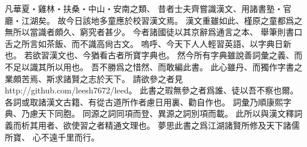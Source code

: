 凡華夏・雞林・扶桑・中山・安南之類、
昔者士夫齊嘗識漢文、用諸書塾・官廳・江湖矣。
故今日該地多童應於校習漢文焉。
漢文重雖如此、槿原之童都爲之無所以當識者頗久、窮究者甚少。
今者諸國徒以其京辭爲通言之本、
舉筆則書口舌之所言如茶飯、而不識高尙古文。
嗚呼、今天下人人輕習英語、以字典日新也。
若欲習漢文也、今猶看古者所寶字典也。
然今所有字典雖說善詞彙之義、而不足以識其所以用也。
吾不勝爲之惜然、而敢編此書。
此心雖丹、而獨作字書之業頗苦焉、斯求諸賢之志於天下。
請欲參之者見 http://github.com/leesh7672/leed。
此書之瑕無參之者爲誰、徒以吾不察也爾。
各詞或取諸漢文古籍、有從古道所作者慮日用裏、勸自作也。
詞彙乃順康熙字典、乃慮天下同胞。
同源之詞同項而登、異源之詞別項而載。
此所以與漢文釋詞義而析其用者、欲使習之者精通文理也。
夢思此書之爲江湖諸賢所修及天下諸儒所寶、
心不遠千里而行。
